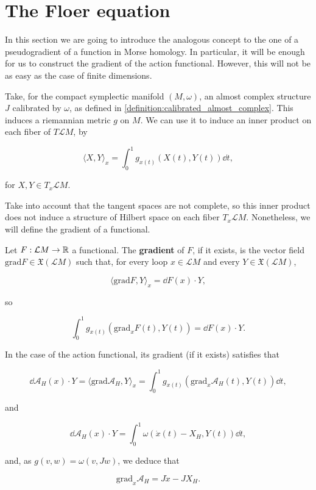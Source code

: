 \section{The Floer equation}

In this section we are going to introduce the analogous concept to the one of a pseudogradient of a function in Morse homology. In particular, it will be enough for us to construct the gradient of the action functional. However, this will not be as easy as the case of finite dimensions.

Take, for the compact symplectic manifold $(M,\omega)$, an almost complex structure $J$ calibrated by $\omega$, as defined in \ref{definition:calibrated_almost_complex}. This induces a riemannian metric $g$ on $M$. We can use it to induce an inner product on each fiber of $T\mathcal{L}M$, by

$$\langle X, Y \rangle_x = \int_0^1 g_{x(t)} (X(t), Y(t)) \dd t,$$

for $X,Y \in T_x\mathcal{L}M$.

Take into account that the tangent spaces are not complete, so this inner product does not induce a structure of Hilbert space on each fiber $T_x\mathcal{L}M$. Nonetheless, we will define the gradient of a functional.

\begin{deff}
Let $F : \mathcal{L}M \rightarrow \mathbb{R}$ a functional. The {\bf gradient} of $F$, if it exists, is the vector field $\text{grad}F \in \mathfrak{X}(\mathcal{L}M)$ such that, for every loop $x \in \mathcal{L}M$ and every $Y \in \mathfrak{X}(\mathcal{L}M)$,

$$\langle \text{grad}F, Y \rangle_x = \dd F(x) \cdot Y ,$$

so

$$\int_0^1 g_{x(t)}(\text{grad}_xF(t),Y(t)) = \dd F(x) \cdot Y .$$
\end{deff}

In the case of the action functional, its gradient (if it exists) satisfies that

$$\dd \mathcal{A}_H(x) \cdot Y = \langle \text{grad}\mathcal{A}_H, Y \rangle_x = \int_0^1 g_{x(t)}(\text{grad}_x\mathcal{A}_H(t),Y(t)) \dd t ,$$

and

$$\dd \mathcal{A}_H(x) \cdot Y = \int_0^1 \omega(\dot{x}(t)-X_H,Y(t)) \dd t ,$$

and, as $g(v,w) = \omega(v,Jw)$, we deduce that

$$\text{grad}_x\mathcal{A}_H = J\dot{x} - J X_H .$$

